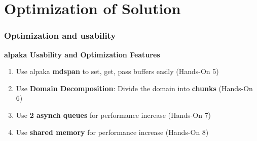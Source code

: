 \documentclass[9pt]{beamer}
\begin{document}
\section{Optimization of Solution}

\begin{frame}
\frametitle{Optimization and usability}
\begin{center}
      \Huge \textbf{alpaka Usability and Optimization Features}
  \end{center}
\begin{enumerate}
 \item Use alpaka \textbf{mdspan} to set, get, pass buffers easily (Hands-On 5)
 \item Use \textbf{Domain Decomposition}: Divide the domain into \textbf{chunks} (Hands-On 6)
 \item Use \textbf{2 asynch queues} for performance increase (Hands-On 7)
 \item Use \textbf{shared memory} for performance increase (Hands-On 8)
\end{enumerate}
    \end{frame}
\end{document}

